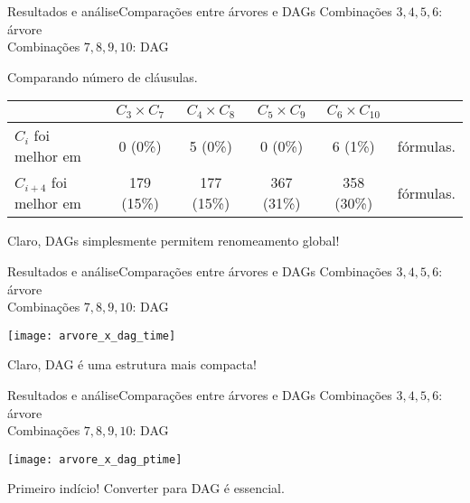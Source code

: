 \begin{frame}{Resultados e análise}{Comparações entre árvores e DAGs}
	Combinações $3,4,5,6$: árvore\\
	Combinações $7,8,9,10$: DAG
	
	\vspace{.1cm}
	\pause \begin{center}Comparando número de cláusulas.\end{center}
	\begin{scriptsize}
	\begin{tabular}{l|c|c|c|c|l}
		& $C_3 \times C_7$ & $C_4 \times C_8$ & $C_5 \times C_9$ & $C_6 \times C_{10}$ \\ \hline
		$C_i$ foi melhor em & 0 (0\%)     & 5 (0\%)     & 0 (0\%)     & 6 (1\%)      & fórmulas. \\
		$C_{i+4}$ foi melhor em   & 179 (15\%)  & 177 (15\%)  & 367 (31\%)  & 358 (30\%)   & fórmulas. \\
	\end{tabular}
	\end{scriptsize}
	
	\vspace{.1cm}
	\pause Claro, DAGs simplesmente permitem renomeamento global!
\end{frame}

\begin{frame}{Resultados e análise}{Comparações entre árvores e DAGs}
	Combinações $3,4,5,6$: árvore\\
	Combinações $7,8,9,10$: DAG
	
	\vspace{-.4cm}
	\pause
	\begin{center}
		\texttt{[image: arvore\_x\_dag\_time]}
	\end{center}
	
	\vspace{-.6cm}
	\pause Claro, DAG é uma estrutura mais compacta!
\end{frame}

\begin{frame}{Resultados e análise}{Comparações entre árvores e DAGs}
	Combinações $3,4,5,6$: árvore\\
	Combinações $7,8,9,10$: DAG
	
	\vspace{-.4cm}
	\pause
	\begin{center}
		\texttt{[image: arvore\_x\_dag\_ptime]}
	\end{center}
	
	\vspace{-.6cm}
	\pause Primeiro indício! \pause Converter para DAG é essencial.
\end{frame}

